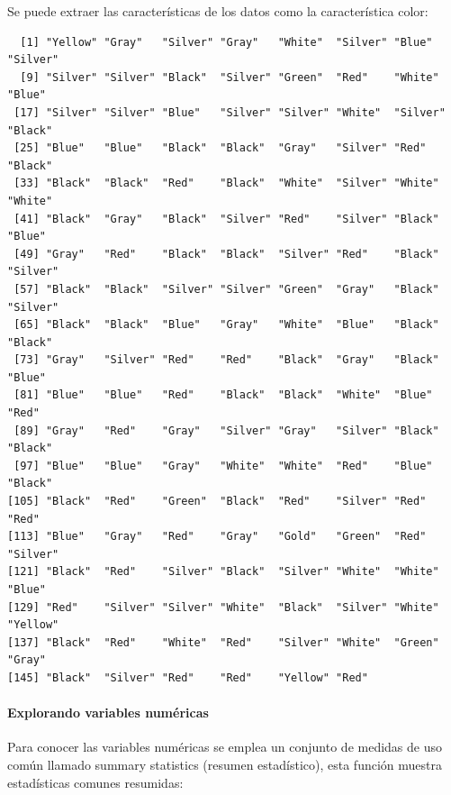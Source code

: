 \documentclass[
  letterpaper,
  DIV=11,
  numbers=noendperiod]{scrartcl}
\let\oldparagraph\paragraph
\renewcommand{\paragraph}[1]{\oldparagraph{#1}\mbox{}}
\newenvironment{Shaded}{\begin{snugshade}}{\end{snugshade}}
\newcommand{\NormalTok}[1]{\textcolor[rgb]{0.00,0.23,0.31}{#1}}
\newcommand{\SpecialCharTok}[1]{\textcolor[rgb]{0.37,0.37,0.37}{#1}}
\begin{document}
Se puede extraer las características de los datos como la característica
color:

\begin{Shaded}
\end{Shaded}

\begin{verbatim}
  [1] "Yellow" "Gray"   "Silver" "Gray"   "White"  "Silver" "Blue"   "Silver"
  [9] "Silver" "Silver" "Black"  "Silver" "Green"  "Red"    "White"  "Blue"  
 [17] "Silver" "Silver" "Blue"   "Silver" "Silver" "White"  "Silver" "Black" 
 [25] "Blue"   "Blue"   "Black"  "Black"  "Gray"   "Silver" "Red"    "Black" 
 [33] "Black"  "Black"  "Red"    "Black"  "White"  "Silver" "White"  "White" 
 [41] "Black"  "Gray"   "Black"  "Silver" "Red"    "Silver" "Black"  "Blue"  
 [49] "Gray"   "Red"    "Black"  "Black"  "Silver" "Red"    "Black"  "Silver"
 [57] "Black"  "Black"  "Silver" "Silver" "Green"  "Gray"   "Black"  "Silver"
 [65] "Black"  "Black"  "Blue"   "Gray"   "White"  "Blue"   "Black"  "Black" 
 [73] "Gray"   "Silver" "Red"    "Red"    "Black"  "Gray"   "Black"  "Blue"  
 [81] "Blue"   "Blue"   "Red"    "Black"  "Black"  "White"  "Blue"   "Red"   
 [89] "Gray"   "Red"    "Gray"   "Silver" "Gray"   "Silver" "Black"  "Black" 
 [97] "Blue"   "Blue"   "Gray"   "White"  "White"  "Red"    "Blue"   "Black" 
[105] "Black"  "Red"    "Green"  "Black"  "Red"    "Silver" "Red"    "Red"   
[113] "Blue"   "Gray"   "Red"    "Gray"   "Gold"   "Green"  "Red"    "Silver"
[121] "Black"  "Red"    "Silver" "Black"  "Silver" "White"  "White"  "Blue"  
[129] "Red"    "Silver" "Silver" "White"  "Black"  "Silver" "White"  "Yellow"
[137] "Black"  "Red"    "White"  "Red"    "Silver" "White"  "Green"  "Gray"  
[145] "Black"  "Silver" "Red"    "Red"    "Yellow" "Red"   
\end{verbatim}

\hypertarget{explorando-variables-numuxe9ricas}{%
\paragraph{Explorando variables
numéricas}\label{explorando-variables-numuxe9ricas}}

Para conocer las variables numéricas se emplea un conjunto de medidas de
uso común llamado summary statistics (resumen estadístico), esta función
muestra estadísticas comunes resumidas:
\end{document}
